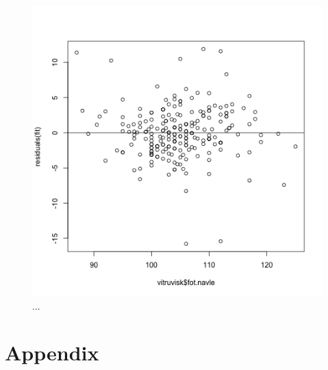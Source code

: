\begin{figure}[H]
		\centering
		\includegraphics[width=0.7\linewidth]{3H.pdf}
		\caption{...}
		\label{fig:3H}
\end{figure}


































\pagebreak

\section*{Appendix}


